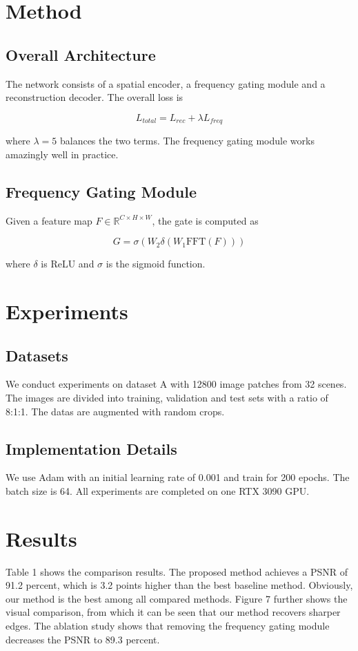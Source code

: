 \documentclass[11pt]{article}
\begin{document}
\section{Method}
\subsection{Overall Architecture}
The network consists of a spatial encoder, a frequency gating module and a reconstruction decoder. The overall loss is

\begin{equation}
L_{total} = L_{rec} + \lambda L_{freq}
\end{equation}

where $\lambda = 5$ balances the two terms. The frequency gating module works amazingly well in practice.

\subsection{Frequency Gating Module}
Given a feature map $F \in \mathbb{R}^{C \times H \times W}$, the gate is computed as

\begin{equation}
G = \sigma(W_2 \delta(W_1 \mathrm{FFT}(F)))
\end{equation}

where $\delta$ is ReLU and $\sigma$ is the sigmoid function.

\section{Experiments}
\subsection{Datasets}
We conduct experiments on dataset A with 12800 image patches from 32 scenes. The images are divided into training, validation and test sets with a ratio of 8:1:1. The datas are augmented with random crops.

\subsection{Implementation Details}
We use Adam with an initial learning rate of 0.001 and train for 200 epochs. The batch size is 64. All experiments are completed on one RTX 3090 GPU.

\section{Results}
Table 1 shows the comparison results. The proposed method achieves a PSNR of 91.2 percent, which is 3.2 points higher than the best baseline method. Obviously, our method is the best among all compared methods. Figure 7 further shows the visual comparison, from which it can be seen that our method recovers sharper edges. The ablation study shows that removing the frequency gating module decreases the PSNR to 89.3 percent.
\end{document}
